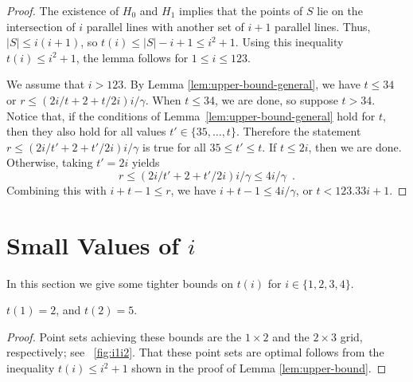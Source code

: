 \documentclass{ws-ijcga}
\begin{document}
\begin{proof}
The existence of $H_0$ and $H_1$ implies that the points of $S$ lie on 
the intersection of $i$ parallel lines with another set of $i+1$ parallel lines.
Thus, $|S|\le i(i+1)$, so $t(i) \le |S|-i+1\le i^2+1$.
Using this inequality $t(i)\le i^2+1$, the lemma follows for $1\le i\le 123$.

We assume that $i>123$.  By Lemma \ref{lem:upper-bound-general},
we have $t\le 34$ or $r\le (2i/t + 2 + t/2i)  i/\gamma$.  When $t\le
34$, we are done, so suppose $t>34$.  Notice that, if the conditions of
Lemma~\ref{lem:upper-bound-general} hold for $t$, then they also hold for
all values $t'\in\{35,\ldots,t\}$.  Therefore the statement $r\le (2i/t'
+ 2 + t'/2i) i/\gamma$ is true for all $35\le t'\le t$.  If $t\le 2i$,
then we are done.  Otherwise, taking $t'=2i$ yields
\[
  r\le (2i/t' + 2 + t'/2i) i/\gamma \le 4i/\gamma \enspace .
\]
Combining this with $i+t-1\le r$, we have $i+t-1\le 4i/\gamma$, or $t< 123.33i+1$.

\end{proof}


\section[Small Values of $i$]{\boldmath Small Values of $i$}

In this section we give some tighter bounds on $t(i)$ for
$i\in\{1,2,3,4\}$.

\begin{lemma}\label{lem:i1i2}
$t(1) = 2$, and $t(2)=5$.
\end{lemma}

\begin{proof}
Point sets achieving these bounds are the $1\times 2$ and the $2\times 3$
grid, respectively; see \figurename~\ref{fig:i1i2}.  
That these point sets are optimal follows from the inequality $t(i)\le i^2+1$ 
shown in the proof of Lemma \ref{lem:upper-bound}.
\end{proof}
\end{document}
